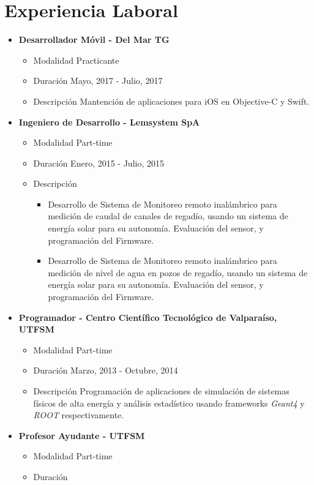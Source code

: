 \documentclass[11pt,letterpaper,sans]{moderncv}
\begin{document}
\section{Experiencia Laboral}
\label{sec:org6f89432}
\begin{itemize}
\item \textbf{Desarrollador Móvil - Del Mar TG}
\begin{itemize}
\item Modalidad
Practicante
\item Duración
Mayo, 2017 - Julio, 2017
\item Descripción
Mantención de aplicaciones para iOS en Objective-C y Swift.
\end{itemize}
\item \textbf{Ingeniero de Desarrollo - Lemsystem SpA}
\begin{itemize}
\item Modalidad
Part-time
\item Duración
Enero, 2015 - Julio, 2015
\item Descripción
\begin{itemize}
\item Desarrollo de Sistema de Monitoreo remoto inalámbrico para medición de caudal de
canales de regadío, usando un sistema de energía solar para su autonomía. Evaluación
del sensor, y programación del Firmware.
\item Desarrollo de Sistema de Monitoreo remoto inalámbrico para medición de nivel de agua en pozos de 
regadío, usando un sistema de energía solar para su autonomía. Evaluación
del sensor, y programación del Firmware.
\end{itemize}
\end{itemize}
\item \textbf{Programador - Centro Científico Tecnológico de Valparaíso, UTFSM}
\begin{itemize}
\item Modalidad
Part-time
\item Duración
Marzo, 2013 - Octubre, 2014
\item Descripción
Programación de aplicaciones de simulación de sistemas físicos de alta energía y análisis estadístico 
usando frameworks \emph{Geant4} y \emph{ROOT} respectivamente.
\end{itemize}
\item \textbf{Profesor Ayudante - UTFSM}
\begin{itemize}
\item Modalidad
Part-time
\item Duración

\end{itemize}
\end{itemize}
\end{document}
